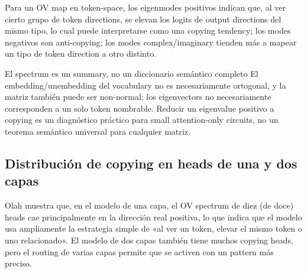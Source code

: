 Para un OV map en token-space, los eigenmodes positivos indican que, al ver cierto grupo de token directions, se elevan los logits de output directions del mismo tipo, lo cual puede interpretarse como una copying tendency; los modes negativos son anti-copying; los modes complex/imaginary tienden más a mapear un tipo de token direction a otro distinto.


\begin{warningbox}{El spectrum es un summary, no un diccionario semántico completo}
El embedding/unembedding del vocabulary no es necesariamente ortogonal, y la matriz también puede ser non-normal; los eigenvectors no necesariamente corresponden a un solo token nombrable. Reducir un eigenvalue positivo a copying es un diagnóstico práctico para small attention-only circuits, no un teorema semántico universal para cualquier matriz.
\end{warningbox}

\subsection{Distribución de copying en heads de una y dos capas}

Olah muestra que, en el modelo de una capa, el OV spectrum de diez (de doce) heads cae principalmente en la dirección real positiva, lo que indica que el modelo usa ampliamente la estrategia simple de «al ver un token, elevar el mismo token o uno relacionado». El modelo de dos capas también tiene muchos copying heads, pero el routing de varias capas permite que se activen con un pattern más preciso.





